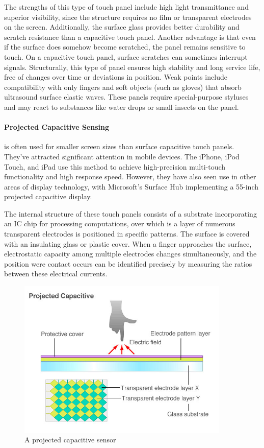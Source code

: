 \documentclass[11pt]{report}
\begin{document}
The strengths of this type of touch panel include high light transmittance and superior visibility, since the structure requires no film or transparent electrodes on the screen. 
Additionally, the surface glass provides better durability and scratch resistance than a capacitive touch panel. 
Another advantage is that even if the surface does somehow become scratched, the panel remains sensitive to touch. 
On a capacitive touch panel, surface scratches can sometimes interrupt signals. 
Structurally, this type of panel ensures high stability and long service life, free of changes over time or deviations in position.
Weak points include compatibility with only fingers and soft objects (such as gloves) that absorb ultrasound surface elastic waves. 
These panels require special-purpose styluses and may react to substances like water drops or small insects on the panel.

\paragraph{Projected Capacitive Sensing}

is often used for smaller screen sizes than surface capacitive touch panels. 
They've attracted significant attention in mobile devices. 
The iPhone, iPod Touch, and iPad use this method to achieve high-precision multi-touch functionality and high response speed.
However, they have also seen use in other areas of display technology, with Microsoft's Surface Hub implementing a 55-inch projected capacitive display.

The internal structure of these touch panels consists of a substrate incorporating an IC chip for processing computations, over which is a layer of numerous transparent electrodes is positioned in specific patterns. 
The surface is covered with an insulating glass or plastic cover. 
When a finger approaches the surface, electrostatic capacity among multiple electrodes changes simultaneously, and the position were contact occurs can be identified precisely by measuring the ratios between these electrical currents.

\begin{figure}
\includegraphics[width=0.9\textwidth]{projcap}
\caption{A projected capacitive sensor}
\end{figure}
\end{document}
